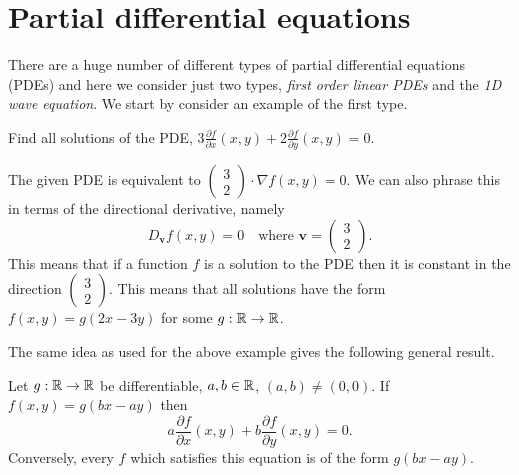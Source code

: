 \section{Partial differential equations}

There are a huge number of different types of partial differential equations (PDEs) and here we consider just two types, \emph{first order linear PDEs} and the \emph{1D wave equation}.
We start by consider an example of the first type.

\begin{example*}
    Find all solutions of the PDE,
    \(3 \frac{\partial f}{\partial x}(x,y) + 2 \frac{\partial f}{\partial y} (x,y) = 0\).
\end{example*}

\begin{solution}
    The given PDE is equivalent to
    \(\left( \begin{smallmatrix}
            3 \\ 2
        \end{smallmatrix} \right)
    \cdot
    \nabla f(x,y) =0\).
    We can also phrase this in terms of the directional derivative, namely
    \[
        D_{\mathbf{v}}f(x,y) = 0 \quad \text{where \(\mathbf{v}=\left( \begin{smallmatrix}
                3 \\ 2
            \end{smallmatrix} \right)\)}.
    \]
    This means that if a function \(f\) is a solution to the PDE then it is constant in the direction \(\left( \begin{smallmatrix}
            3 \\ 2
        \end{smallmatrix} \right)\).
    This means that all solutions have the form \(f(x,y) = g(2x-3y)\) for some \(g:\mathbb{R} \to \mathbb{R}\).
\end{solution}

The same idea as used for the above example gives the following general result.

\begin{theorem}
    Let \(g:\mathbb{R}\to\mathbb{R}\) be differentiable, \(a,b\in \mathbb{R}\), \((a,b)\neq (0,0)\).
    If \(f(x,y)= g(bx-ay)\) then
    \[
        a \frac{\partial f}{\partial x} (x,y) + b \frac{\partial f}{\partial y} (x,y) = 0.
    \]
    Conversely, every \(f\) which satisfies this equation is of the form \(g(bx-ay)\).
\end{theorem}

